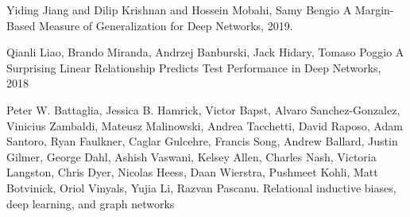 \documentclass{article}
\begin{document}
\begin{thebibliography}{9}
Yiding Jiang and Dilip Krishnan and Hossein Mobahi, Samy Bengio 
A Margin-Based Measure of Generalization for Deep Networks, 2019.

Qianli Liao, Brando Miranda, Andrzej Banburski, Jack Hidary, Tomaso Poggio
A Surprising Linear Relationship Predicts Test Performance in Deep Networks, 2018

Peter W. Battaglia, Jessica B. Hamrick, Victor Bapst, Alvaro Sanchez-Gonzalez, Vinicius Zambaldi, Mateusz Malinowski, Andrea Tacchetti, David Raposo, Adam Santoro, Ryan Faulkner, Caglar Gulcehre, Francis Song, Andrew Ballard, Justin Gilmer, George Dahl, Ashish Vaswani, Kelsey Allen, Charles Nash, Victoria Langston, Chris Dyer, Nicolas Heess, Daan Wierstra, Pushmeet Kohli, Matt Botvinick, Oriol Vinyals, Yujia Li, Razvan Pascanu.
Relational inductive biases, deep learning, and graph networks

\end{thebibliography}
\end{document}
